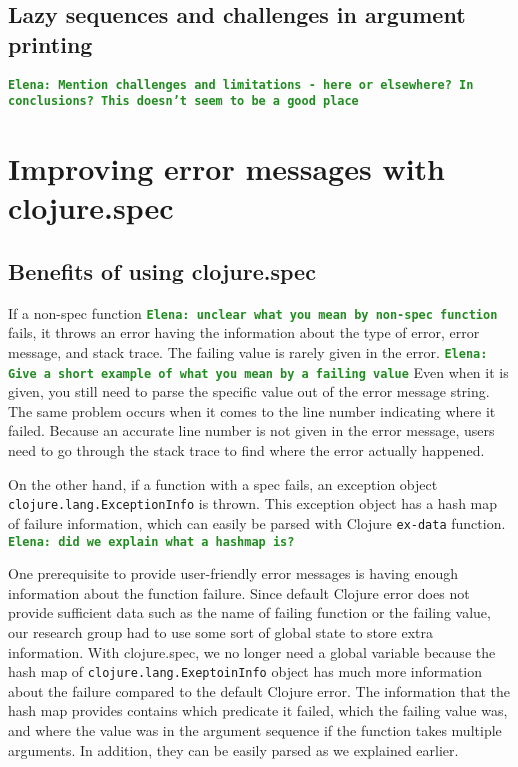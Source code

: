 \documentclass[12pt]{article}
\newcommand{\comment}[1]{{\bf \tt  {#1}}}
\newcommand{\emcomment}[1]{\textcolor{ForestGreen}{\comment{Elena: {#1}}}}
\begin{document}
\subsection{Lazy sequences and challenges in argument printing}



\emcomment{Mention challenges and limitations - here or elsewhere? In conclusions? 
This doesn't seem to be a good place}

\section{Improving error messages with clojure.spec}
	\subsection{Benefits of using clojure.spec}
	If a non-spec function \emcomment{unclear what you mean by non-spec function} fails, 
	it throws an error having the information about the type of error, error message, and stack 
	trace. The failing value is rarely given in the error. \emcomment{Give a short example of what you mean by a failing value}
	  Even when it is given, you still need to parse the specific value out of 
	the error message string. The same problem occurs when it comes to the line number indicating where it failed. 
	Because an accurate line number is not given in the error message, users need to go through the stack trace to find 
	where the error actually happened. 

	On the other hand, if a function with a spec fails, an exception object {\tt 
	clojure.lang.ExceptionInfo} is thrown. This exception object has a hash map of failure information, which can easily be 
	parsed with Clojure {\tt ex-data} function. \emcomment{did we explain what a hashmap is?}

	One prerequisite to provide user-friendly error messages is having enough information about the function failure. Since 
	default Clojure error does not provide sufficient data such as the name of failing function or the failing value, our 
	research group had to use some sort of global state to store extra information. With clojure.spec, we no longer need a 
	global variable because the hash map of {\tt clojure.lang.ExeptoinInfo} object has much more information about the 
	failure compared to the default Clojure error. The information that the hash map provides contains which predicate it 
	failed, which the failing value was, and where the value was in the argument sequence if the function takes multiple 
	arguments. In addition, they can be easily parsed as we explained earlier.
	
\end{document}
